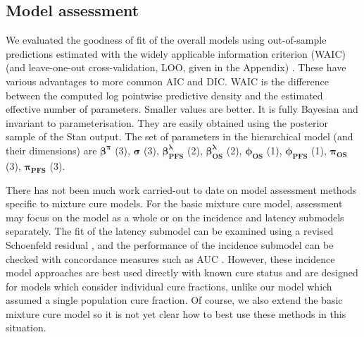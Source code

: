 \documentclass[AMA,STIX1COL]{WileyNJD-v2}
\begin{document}
%
\subsection{Model assessment}
We evaluated the goodness of fit of the overall models using out-of-sample predictions estimated with the widely applicable information criterion (WAIC) (and leave-one-out cross-validation, LOO, given in the Appendix) \cite{Vehtari2017}. These have various advantages to more common AIC and DIC. WAIC is the difference between the computed log pointwise predictive density and the estimated effective number of parameters. Smaller values are better. It is fully Bayesian and invariant to parameterisation. They are easily obtained using the posterior sample of the Stan output.
The set of parameters in the hierarchical model (and their dimensions) are
$\mathbf{\beta^{\pi}}$ (3), $\mathbf{\sigma}$ (3), $\mathbf{\beta^{\lambda}_{PFS}}$ (2), $\mathbf{\beta^{\lambda}_{OS}}$ (2), $\mathbf{\phi_{OS}}$ (1), $\mathbf{\phi_{PFS}}$ (1), $\mathbf{\pi_{OS}}$ (3), $\mathbf{\pi_{PFS}}$ (3).



There has not been much work carried-out to date on model assessment methods specific to mixture cure models.
For the basic mixture cure model, assessment may focus on the model as a whole or on the incidence and latency submodels separately.
The fit of the latency submodel can be examined using a revised Schoenfeld residual \cite{Wileyto2013}, and the performance of the incidence submodel can be checked with concordance measures such as AUC \cite{Peng2021}.
However, these incidence model approaches are best used directly with known cure status and are designed for models which consider individual cure fractions, unlike our model which assumed a single population cure fraction.
Of course, we also extend the basic mixture cure model so it is not yet clear how to best use these methods in this situation. 
\end{document}
